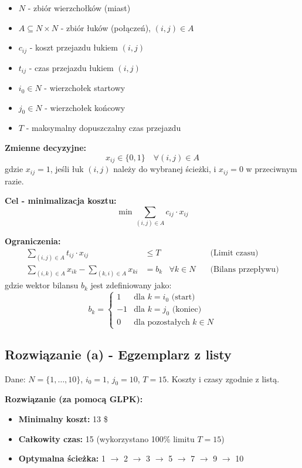 \documentclass[11pt, a4paper]{article}
\begin{document}
\begin{itemize}
    \item $N$ - zbiór wierzchołków (miast)
    \item $A \subseteq N \times N$ - zbiór łuków (połączeń), $(i, j) \in A$
    \item $c_{ij}$ - koszt przejazdu łukiem $(i, j)$
    \item $t_{ij}$ - czas przejazdu łukiem $(i, j)$
    \item $i_0 \in N$ - wierzchołek startowy
    \item $j_0 \in N$ - wierzchołek końcowy
    \item $T$ - maksymalny dopuszczalny czas przejazdu
\end{itemize}

\noindent \textbf{Zmienne decyzyjne:}
$$ x_{ij} \in \{0, 1\} \quad \forall (i, j) \in A $$
gdzie $x_{ij} = 1$, jeśli łuk $(i, j)$ należy do wybranej ścieżki, i $x_{ij} = 0$ w przeciwnym razie.

\noindent \textbf{Cel - minimalizacja kosztu:}
$$ \min \sum_{(i, j) \in A} c_{ij} \cdot x_{ij} $$

\noindent \textbf{Ograniczenia:}
\begin{align*}
    \sum_{(i, j) \in A} t_{ij} \cdot x_{ij} &\le T & &\text{(Limit czasu)} \\
    \sum_{(i, k) \in A} x_{ik} - \sum_{(k, i) \in A} x_{ki} &= b_k & \forall k \in N \quad &\text{(Bilans przepływu)}
\end{align*}
gdzie wektor bilansu $b_k$ jest zdefiniowany jako:
$$ b_k = \begin{cases} 
      1 & \text{dla } k = i_0 \text{ (start)} \\
      -1 & \text{dla } k = j_0 \text{ (koniec)} \\
      0 & \text{dla pozostałych } k \in N
   \end{cases}
$$

\subsection{Rozwiązanie (a) - Egzemplarz z listy}
Dane: $N = \{1, \dots, 10\}$, $i_0 = 1$, $j_0 = 10$, $T = 15$. Koszty i czasy zgodnie z listą.

\noindent \textbf{Rozwiązanie (za pomocą GLPK):}
\begin{itemize}
    \item \textbf{Minimalny koszt:} 13 \$
    \item \textbf{Całkowity czas:} 15 (wykorzystano 100\% limitu $T=15$)
    \item \textbf{Optymalna ścieżka:} 1 $\to$ 2 $\to$ 3 $\to$ 5 $\to$ 7 $\to$ 9 $\to$ 10
\end{itemize}
\end{document}

